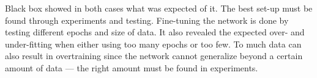 

Black box showed in both cases what was expected of it. The best set-up must be found through experiments and testing. Fine-tuning the network is done by testing different epochs and size of data. It also revealed the expected over- and under-fitting when either using too many epochs or too few. To much data can also result in overtraining since the network cannot generalize beyond a certain amount of data --- the right amount must be found in experiments. 